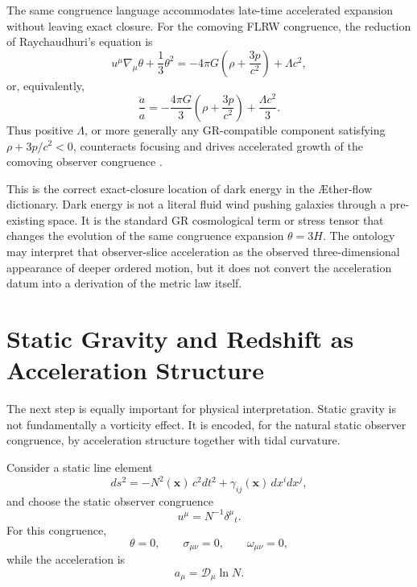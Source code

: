\documentclass[11pt]{article}
\newcommand{\Aflow}{\AE{}ther-flow}
\newcommand{\Proj}{\mathcal{D}}
\begin{document}
The same congruence language accommodates late-time accelerated expansion without leaving exact closure. For the comoving FLRW congruence, the reduction of Raychaudhuri's equation is
\begin{equation}
u^\mu \nabla_\mu \theta
+\frac{1}{3}\theta^2
=
-4\pi G\left(\rho+\frac{3p}{c^2}\right)
+\Lambda c^2,
\label{eq:raychaudhuri_flrw_lambda}
\end{equation}
or, equivalently,
\begin{equation}
\frac{\ddot a}{a}
=
-\frac{4\pi G}{3}\left(\rho+\frac{3p}{c^2}\right)
+\frac{\Lambda c^2}{3}.
\label{eq:flrw_accel_lambda}
\end{equation}
Thus positive \(\Lambda\), or more generally any GR-compatible component satisfying \(\rho+3p/c^2<0\), counteracts focusing and drives accelerated growth of the comoving observer congruence \cite{Riess1998,Perlmutter1999,Planck2018Parameters}.

This is the correct exact-closure location of dark energy in the \Aflow{} dictionary. Dark energy is not a literal fluid wind pushing galaxies through a pre-existing space. It is the standard GR cosmological term or stress tensor that changes the evolution of the same congruence expansion \(\theta=3H\). The ontology may interpret that observer-slice acceleration as the observed three-dimensional appearance of deeper ordered motion, but it does not convert the acceleration datum into a derivation of the metric law itself.

\section{Static Gravity and Redshift as Acceleration Structure}

The next step is equally important for physical interpretation. Static gravity is not fundamentally a vorticity effect. It is encoded, for the natural static observer congruence, by acceleration structure together with tidal curvature.

Consider a static line element
\begin{equation}
ds^2
=
-N^2(\mathbf{x})\,c^2dt^2
+
\gamma_{ij}(\mathbf{x})\,dx^i dx^j,
\label{eq:staticmetric}
\end{equation}
and choose the static observer congruence
\begin{equation}
u^\mu = N^{-1}\delta^\mu{}_t.
\label{eq:staticu}
\end{equation}
For this congruence,
\begin{equation}
\theta=0,
\qquad
\sigma_{\mu\nu}=0,
\qquad
\omega_{\mu\nu}=0,
\label{eq:statickinematics}
\end{equation}
while the acceleration is
\begin{equation}
a_\mu = \Proj_\mu \ln N.
\label{eq:staticacceleration}
\end{equation}
\end{document}
